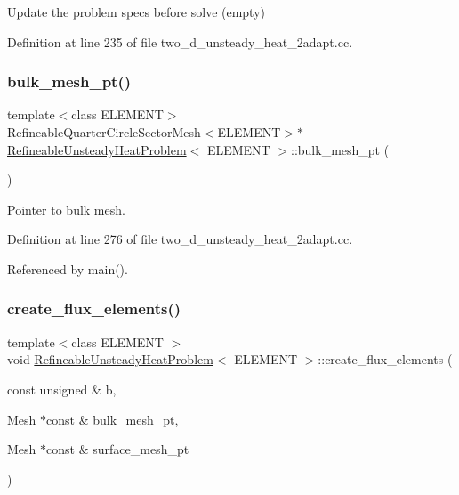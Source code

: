 Update the problem specs before solve (empty) 



Definition at line 235 of file two\+\_\+d\+\_\+unsteady\+\_\+heat\+\_\+2adapt.\+cc.

\mbox{\label{classRefineableUnsteadyHeatProblem_a4d8eec1505a3c53960a3182ec462b4e7}} 
\subsubsection{\texorpdfstring{bulk\+\_\+mesh\+\_\+pt()}{bulk\_mesh\_pt()}}
{\footnotesize\ttfamily template$<$class E\+L\+E\+M\+E\+NT$>$ \\
Refineable\+Quarter\+Circle\+Sector\+Mesh$<$E\+L\+E\+M\+E\+NT$>$$\ast$ \hyperlink{classRefineableUnsteadyHeatProblem}{Refineable\+Unsteady\+Heat\+Problem}$<$ E\+L\+E\+M\+E\+NT $>$\+::bulk\+\_\+mesh\+\_\+pt (\begin{DoxyParamCaption}{ }\end{DoxyParamCaption})\hspace{0.3cm}{\ttfamily [inline]}}



Pointer to bulk mesh. 



Definition at line 276 of file two\+\_\+d\+\_\+unsteady\+\_\+heat\+\_\+2adapt.\+cc.



Referenced by main().

\mbox{\label{classRefineableUnsteadyHeatProblem_a65601ec64c73ac578b43f4af04c46569}} 
\subsubsection{\texorpdfstring{create\+\_\+flux\+\_\+elements()}{create\_flux\_elements()}}
{\footnotesize\ttfamily template$<$class E\+L\+E\+M\+E\+NT $>$ \\
void \hyperlink{classRefineableUnsteadyHeatProblem}{Refineable\+Unsteady\+Heat\+Problem}$<$ E\+L\+E\+M\+E\+NT $>$\+::create\+\_\+flux\+\_\+elements (\begin{DoxyParamCaption}\item[{const unsigned \&}]{b,  }\item[{Mesh $\ast$const \&}]{bulk\+\_\+mesh\+\_\+pt,  }\item[{Mesh $\ast$const \&}]{surface\+\_\+mesh\+\_\+pt }\end{DoxyParamCaption})}



